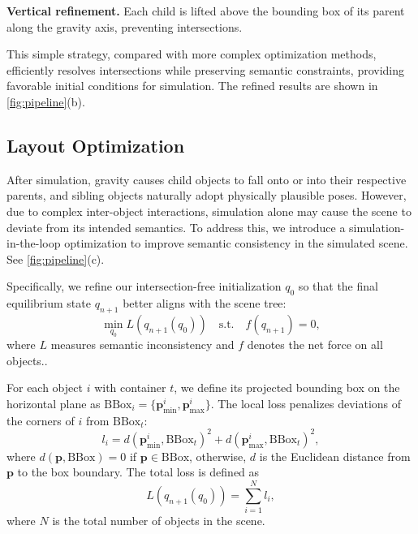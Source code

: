 \textbf{Vertical refinement.} Each child is lifted above the bounding box of its parent along the gravity axis, preventing intersections.

This simple strategy, compared with more complex optimization methods, efficiently resolves intersections while preserving semantic constraints, providing favorable initial conditions for simulation. The refined results are shown in \autoref{fig:pipeline}(b).




\subsection{Layout Optimization}
\label{sec:layout_opt}\label{sec:diff_sim_optim}

After simulation, gravity causes child objects to fall onto or into their respective parents, and sibling objects naturally adopt physically plausible poses. However, due to complex inter-object interactions, simulation alone may cause the scene to deviate from its intended semantics. 
To address this, we introduce a simulation-in-the-loop optimization to improve semantic consistency in the simulated scene. See \autoref{fig:pipeline}(c).


Specifically, we refine our intersection-free initialization $q_0$ so that the final equilibrium state $q_{n+1}$ better aligns with the scene tree:
\begin{equation}
    \min_{q_0} L(q_{n+1}(q_0)) 
    \quad \text{s.t.} \quad f(q_{n+1}) = 0,
    \label{eq:loss}
\end{equation}
where $L$ measures semantic inconsistency and $f$ denotes the net force on all objects..

For each object $i$ with container $t$, we define its projected bounding box on the horizontal plane as 
$\text{BBox}_i = \{\mathbf{p}^i_{\min}, \mathbf{p}^i_{\max}\}$.  
The local loss penalizes deviations of the corners of $i$ from $\text{BBox}_t$:
\begin{equation}
    l_i = d(\mathbf{p}^i_{\min}, \text{BBox}_t)^2 +
          d(\mathbf{p}^i_{\max}, \text{BBox}_t)^2,
    \label{eq:local_loss}
\end{equation}
where $d(\mathbf{p}, \text{BBox})=0$ if $\mathbf{p}\in\text{BBox}$, otherwise, $d$ is the Euclidean distance from $\mathbf{p}$ to the box boundary.  
The total loss is defined as
\begin{equation}
    L(q_{n+1}(q_0)) = \sum_{i=1}^{N} l_i,
    \label{eq:total_loss}
\end{equation}
where $N$ is the total number of objects in the scene.

